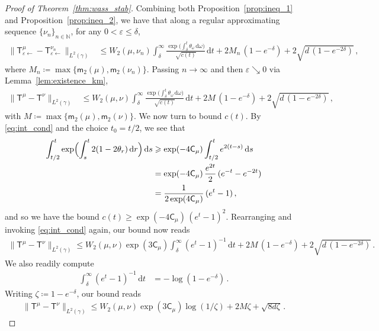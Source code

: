 \documentclass[12pt]{article}
\newcommand{\N}{\mathbb{N}}
\newcommand{\1}{\mathds{1}}
\newcommand*{\rd}{\mathrm{d}}
\newcommand*{\dd}{\, \rd}
\newcommand{\eps}{\varepsilon}
\newcommand{\deq}{\coloneqq}
\renewcommand{\geq}{\geqslant}
\renewcommand{\leq}{\leqslant}
\renewcommand{\le}{\leqslant}
\newcommand{\KM}{\mathsf T}
\newcommand{\mom}{\mathsf m_2}
\theoremstyle{plain}
\theoremstyle{definition}
\theoremstyle{remark}
\begin{document}
\begin{proof}[Proof of Theorem~\ref{thm:wass_stab}]
Combining both Proposition~\ref{prop:ineq_1} and Proposition~\ref{prop:ineq_2}, we have that along a regular approximating sequence $\{\nu_n\}_{n\in\N}$, for any $0 < \eps \le \delta$,
\begin{align*}
    \|\KM^\mu_{\eps\gets} - \KM^{\nu_n}_{\eps\gets}\|_{L^2(\gamma)}
    &\le W_2(\mu,\nu_n)\int_\delta^\infty \frac{\exp\bigl(\textstyle \int_\delta^t \theta_\omega \dd \omega\bigr)}{\sqrt{c(t)}}\dd t + 2M_n\,(1-e^{-\delta}) + 2\sqrt{d\,(1-e^{-2\delta})}\,,
\end{align*}
where $M_n \deq \max\{\mom(\mu), \mom(\nu_n)\}$.
Passing $n\to\infty$ and then $\eps\searrow 0$ via Lemma~\ref{lem:existence_km},
\begin{align*}
    \|\KM^\mu - \KM^{\nu}\|_{L^2(\gamma)}
    &\le W_2(\mu,\nu)\int_\delta^\infty \frac{\exp\bigl(\textstyle \int_\delta^t \theta_\omega \dd \omega\bigr)}{\sqrt{c(t)}}\dd t + 2M\,(1-e^{-\delta}) + 2\sqrt{d\,(1-e^{-2\delta})}\,,
\end{align*}
with $M \deq \max\{\mom(\mu), \mom(\nu)\}$.
We now turn to bound $c(t)$. By \eqref{eq:int_cond} and the choice $t_0 = t/2$, we see that
\begin{align*}
    \int_{t/2}^t \exp\Bigl(\int_s^t 2(1-2\theta_r) \dd r \Bigr)\dd s &\geq \exp(-4\mathsf C_\mu) \int_{t/2}^t e^{2(t-s)}\dd s \\
    &= \exp(-4\mathsf C_\mu)\,  \frac{e^{2t}}{2}\,(e^{-t} - e^{-2t}) \\
    &= \frac{1}{2\exp(4\mathsf C_\mu)}\, (e^t - 1)\,,
\end{align*}
and so we have the bound $c(t) \geq \exp(-4\mathsf C_\mu)\,(e^{t}-1)^{2}$. 
Rearranging and invoking \eqref{eq:int_cond} again, our bound now reads
\begin{align*}
    \|\mathsf T^{\mu} - \mathsf T^{\nu}\|_{L^2(\gamma)} \leq  W_2(\mu,\nu) \exp(3\mathsf C_\mu) \int_\delta^\infty (e^t-1)^{-1} \dd t + 2M\,(1-e^{-\delta}) + 2\sqrt{d\,(1-e^{-2\delta})}\,.
\end{align*}
We also readily compute
\begin{align*}
    \int_\delta^\infty (e^t - 1)^{-1} \dd t &= - \log(1-e^{-\delta})\,.
\end{align*}
Writing $\zeta \deq 1-e^{-\delta}$, our bound reads
\begin{align*}
    \|\mathsf T^{\mu} - \mathsf T^{\nu}\|_{L^2(\gamma)} \leq  W_2(\mu,\nu) \exp(3\mathsf C_\mu) \log(1/\zeta) + 2M\zeta + \sqrt{8d\zeta}\,.
\end{align*}

\end{proof}
\end{document}
